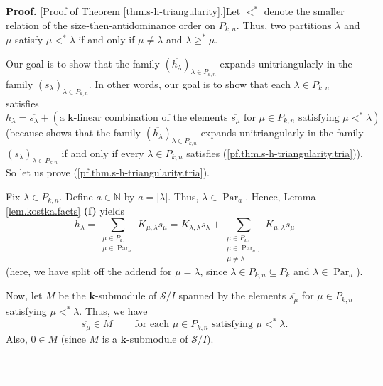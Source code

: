 \documentclass[numbers=enddot,12pt,final,onecolumn,notitlepage]{scrartcl}%
\theoremstyle{definition}
\newenvironment{proof}[1][Proof]{\noindent\textbf{#1.} }{\ \rule{0.5em}{0.5em}}
\let\sumnonlimits\sum
\renewcommand{\sum}{\sumnonlimits\limits}
\begin{document}
\begin{proof}
[Proof of Theorem \ref{thm.s-h-triangularity}.]Let $<^{\ast}$ denote the
smaller relation of the size-then-antidominance order on $P_{k,n}$. Thus, two
partitions $\lambda$ and $\mu$ satisfy $\mu<^{\ast}\lambda$ if and only if
$\mu\neq\lambda$ and $\lambda\geq^{\ast}\mu$.

Our goal is to show that the family $\left(  \overline{h_{\lambda}}\right)
_{\lambda\in P_{k,n}}$ expands unitriangularly in the family $\left(
\overline{s_{\lambda}}\right)  _{\lambda\in P_{k,n}}$. In other words, our
goal is to show that each $\lambda\in P_{k,n}$ satisfies%
\begin{equation}
\overline{h_{\lambda}}=\overline{s_{\lambda}}+\left(  \text{a }\mathbf{k}%
\text{-linear combination of the elements }\overline{s_{\mu}}\text{ for }%
\mu\in P_{k,n}\text{ satisfying }\mu<^{\ast}\lambda\right)
\label{pf.thm.s-h-triangularity.tria}%
\end{equation}
(because \cite[Remark 11.1.17(c)]{GriRei18} shows that the family $\left(
\overline{h_{\lambda}}\right)  _{\lambda\in P_{k,n}}$ expands unitriangularly
in the family $\left(  \overline{s_{\lambda}}\right)  _{\lambda\in P_{k,n}}$
if and only if every $\lambda\in P_{k,n}$ satisfies
(\ref{pf.thm.s-h-triangularity.tria})). So let us prove
(\ref{pf.thm.s-h-triangularity.tria}).

Fix $\lambda\in P_{k,n}$. Define $a\in\mathbb{N}$ by $a=\left\vert
\lambda\right\vert $. Thus, $\lambda\in\operatorname*{Par}\nolimits_{a}$.
Hence, Lemma \ref{lem.kostka.facts} \textbf{(f)} yields%
\begin{equation}
h_{\lambda}=\sum_{\substack{\mu\in P_{k};\\\mu\in\operatorname*{Par}%
\nolimits_{a}}}K_{\mu,\lambda}s_{\mu}=K_{\lambda,\lambda}s_{\lambda}%
+\sum_{\substack{\mu\in P_{k};\\\mu\in\operatorname*{Par}\nolimits_{a}%
;\\\mu\neq\lambda}}K_{\mu,\lambda}s_{\mu} \label{pf.thm.s-h-triangularity.3}%
\end{equation}
(here, we have split off the addend for $\mu=\lambda$, since $\lambda\in
P_{k,n}\subseteq P_{k}$ and $\lambda\in\operatorname*{Par}\nolimits_{a}$).

Now, let $M$ be the $\mathbf{k}$-submodule of $\mathcal{S}/I$ spanned by the
elements $\overline{s_{\mu}}$ for $\mu\in P_{k,n}$ satisfying $\mu<^{\ast
}\lambda$. Thus, we have%
\begin{equation}
\overline{s_{\mu}}\in M\ \ \ \ \ \ \ \ \ \ \text{for each }\mu\in
P_{k,n}\text{ satisfying }\mu<^{\ast}\lambda.
\label{pf.thm.s-h-triangularity.inM}%
\end{equation}
Also, $0\in M$ (since $M$ is a $\mathbf{k}$-submodule of $\mathcal{S}/I$).


\end{proof}
\end{document}
